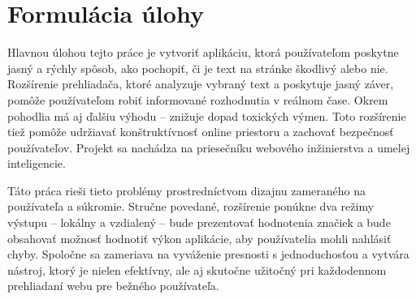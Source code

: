 \section*{Formulácia úlohy}

Hlavnou úlohou tejto práce je vytvoriť aplikáciu, ktorá používateľom poskytne jasný a rýchly spôsob, ako pochopiť, či je text na stránke škodlivý alebo nie. Rozšírenie prehliadača, ktoré analyzuje vybraný text a poskytuje jasný záver, pomôže používateľom robiť informované rozhodnutia v reálnom čase. Okrem pohodlia má aj ďalšiu výhodu – znižuje dopad toxických výmen. Toto rozšírenie tiež pomôže udržiavať konštruktívnosť online priestoru a zachovať bezpečnosť používateľov. Projekt sa nachádza na priesečníku webového inžinierstva a umelej inteligencie.

Táto práca rieši tieto problémy prostredníctvom dizajnu zameraného na používateľa a súkromie. Stručne povedané, rozšírenie ponúkne dva režimy výstupu – lokálny a vzdialený – bude prezentovať hodnotenia značiek a bude obsahovať možnosť hodnotiť výkon aplikácie, aby používatelia mohli nahlásiť chyby. Spoločne sa zameriava na vyváženie presnosti s jednoduchosťou a vytvára nástroj, ktorý je nielen efektívny, ale aj skutočne užitočný pri každodennom prehliadaní webu pre bežného používateľa.